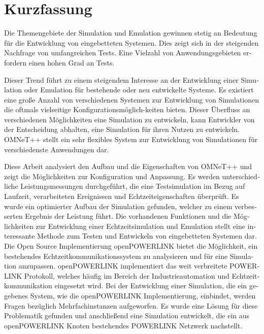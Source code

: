 
\chapter{Kurzfassung}
\begin{german}
Die Themengebiete der Simulation und Emulation gewinnen stetig an Bedeutung für die Entwicklung von eingebetteten Systemen. %
Dies zeigt sich in der steigenden Nachfrage von umfangreichen Tests.
Eine Vielzahl von Anwendungsgebieten erfordern einen hohen Grad an Tests.

Dieser Trend führt zu einem steigendem Interesse an der Entwicklung einer Simulation oder Emulation für bestehende oder neu entwickelte Systeme.
Es existiert eine große Anzahl von verschiedenen Systemen zur Entwicklung von Simulationen die oftmals vielseitige Konfigurationsmöglich-keiten bieten.
Dieser Überfluss an verschiedenen Möglichkeiten eine Simulation zu entwickeln, kann Entwickler von der Entscheidung abhalten, eine Simulation für ihren Nutzen zu entwickeln.
OMNeT++ stellt ein sehr flexibles System zur Entwicklung von Simulationen für verschiedenste Anwendungen dar.

\begin{sloppypar}
Diese Arbeit analysiert den Aufbau und die Eigenschaften von OMNeT++ und zeigt die Möglichkeiten zur Konfiguration und Anpassung.
Es werden unterschiedliche Leistungsmessungen durchgeführt, die eine Testsimulation im Bezug auf Laufzeit, verarbeiteten Ereignissen und Echtzeiteigenschaften überprüft.
Es wurde ein optimierter Aufbau der Simulation gefunden, welcher zu einem verbesserten Ergebnis der Leistung führt.
Die vorhandenen Funktionen und die Möglichkeiten zur Entwicklung einer Echtzeitsimulation und Emulation stellt eine interessante Methode zum Testen und Entwickeln von eingebetteten Systemen dar. %
Die Open Source Implementierung openPOWERLINK bietet die Möglichkeit, ein bestehendes Echtzeitkommunikationssystem zu analysieren und für eine Simulation anzupassen.
openPOWERLINK implementiert das weit verbreitete POWERLINK Protokoll, welches häufig im Bereich der Industrieautomation und Echtzeitkommunikation eingesetzt wird.
Bei der Entwicklung einer Simulation, die ein gegebenes System, wie die openPOWERLINK Implementierung, einbindet, werden Fragen bezüglich Mehrfachinstanzen aufgeworfen.
Es wurde eine Lösung für diese Problematik gefunden und anschließend eine Simulation entwickelt, die ein aus openPOWERLINK Knoten bestehendes POWERLINK Netzwerk nachstellt.
\end{sloppypar}
    
\end{german}
